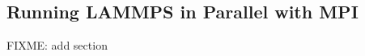 \documentclass[9pt,tutorial]{livecoms}
\begin{document}
\begin{appendices}





  \section{Running LAMMPS in Parallel with MPI}
  \label{parallel-lammps-label}
  FIXME: add section
\end{appendices}
\end{document}
